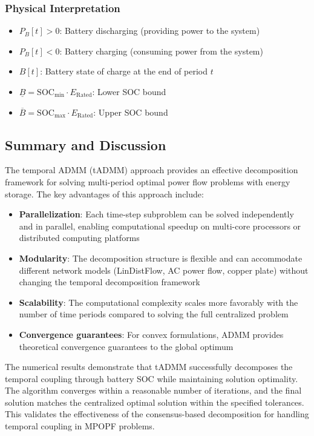 \subsubsection{Physical Interpretation}
\begin{itemize}
    \item $P_B[t] > 0$: Battery discharging (providing power to the system)
    \item $P_B[t] < 0$: Battery charging (consuming power from the system)
    \item $B[t]$: Battery state of charge at the end of period $t$
    \item $\underline{B} = \text{SOC}_{\min} \cdot E_{\text{Rated}}$: Lower SOC bound
    \item $\overline{B} = \text{SOC}_{\max} \cdot E_{\text{Rated}}$: Upper SOC bound
\end{itemize}

\subsection{Summary and Discussion}

The temporal ADMM (tADMM) approach provides an effective decomposition framework for solving multi-period optimal power flow problems with energy storage. The key advantages of this approach include:

\begin{itemize}
    \item \textbf{Parallelization}: Each time-step subproblem can be solved independently and in parallel, enabling computational speedup on multi-core processors or distributed computing platforms
    \item \textbf{Modularity}: The decomposition structure is flexible and can accommodate different network models (LinDistFlow, AC power flow, copper plate) without changing the temporal decomposition framework
    \item \textbf{Scalability}: The computational complexity scales more favorably with the number of time periods compared to solving the full centralized problem
    \item \textbf{Convergence guarantees}: For convex formulations, ADMM provides theoretical convergence guarantees to the global optimum~\cite{admm_boyd_website, admm_cmu_notes}
\end{itemize}

The numerical results demonstrate that tADMM successfully decomposes the temporal coupling through battery SOC while maintaining solution optimality. The algorithm converges within a reasonable number of iterations, and the final solution matches the centralized optimal solution within the specified tolerances. This validates the effectiveness of the consensus-based decomposition for handling temporal coupling in MPOPF problems.

